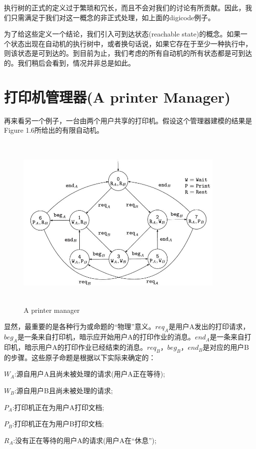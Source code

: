 \documentclass{book}
\begin{document}
    执行树的正式的定义过于繁琐和冗长，而且不会对我们的讨论有所贡献。因此，我们只需满足于我们对这一概念的非正式处理，如上面的digicode例子。

    为了给这些定义一个结论，我们引入可到达状态(reachable state)的概念。如果一个状态出现在自动机的执行树中，或者换句话说，如果它存在于至少一种执行中，则该状态是可到达的。到目前为止，我们考虑的所有自动机的所有状态都是可到达的。我们稍后会看到，情况并非总是如此。

    \section{打印机管理器(A printer Manager)}
    再来看另一个例子，一台由两个用户共享的打印机。假设这个管理器建模的结果是Figure 1.6所给出的有限自动机。
    \begin{figure}
    \centering
    \includegraphics[height=3.4in,width=4.0in]{1_6.jpg}
    \caption{A printer manager}
    \end{figure}

    显然，最重要的是各种行为或命题的“物理”意义。$req_A$是用户A发出的打印请求，$beg_A$是一条来自打印机，暗示应开始用户A的打印作业的消息。$end_A$是一条来自打印机，暗示用户A的打印作业已经结束的消息。$req_B$，$beg_B$，$end_B$是对应的用户B的步骤。这些原子命题是根据以下实际来确定的：

    $W_A$:源自用户A且尚未被处理的请求(用户A正在等待);

    $W_B$:源自用户B且尚未被处理的请求;

    $P_A$:打印机正在为用户A打印文档;

    $P_B$:打印机正在为用户B打印文档;

    $R_A$:没有正在等待的用户A的请求(用户A在“休息”);
\end{document}
